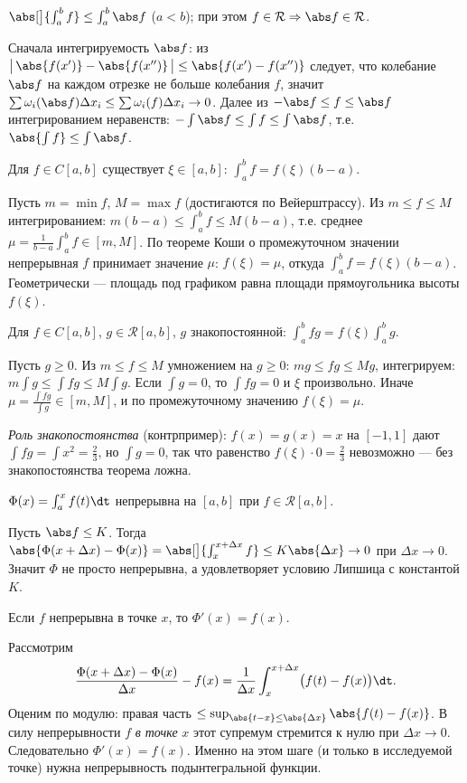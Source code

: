 \stmt $\abs[\big]{\int_a^b f}\le\int_a^b\abs f$ ($a<b$); при этом $f\in\mathcal R\Rightarrow\abs f\in\mathcal R$.

\dok Сначала интегрируемость $\abs f$: из $\bigl|\,\abs{f(x')}-\abs{f(x'')}\,\bigr|\le\abs{f(x')-f(x'')}$
следует, что колебание $\abs f$ на каждом отрезке не больше колебания $f$, значит
$\sum\omega_i(\abs f)\Delta x_i\le\sum\omega_i(f)\Delta x_i\to0$. Далее из $-\abs f\le f\le\abs f$
интегрированием неравенств: $-\int\abs f\le\int f\le\int\abs f$, т.е. $\abs{\int f}\le\int\abs f$.

\stmt Для $f\in C[a,b]$ существует $\xi\in[a,b]$: $\int_a^b f=f(\xi)(b-a)$.

\dok Пусть $m=\min f$, $M=\max f$ (достигаются по Вейерштрассу). Из $m\le f\le M$ интегрированием:
$m(b-a)\le\int_a^b f\le M(b-a)$, т.е. среднее $\mu=\tfrac{1}{b-a}\int_a^b f\in[m,M]$. По теореме
Коши о промежуточном значении непрерывная $f$ принимает значение $\mu$: $f(\xi)=\mu$, откуда
$\int_a^b f=f(\xi)(b-a)$. Геометрически — площадь под графиком равна площади прямоугольника высоты
$f(\xi)$.

\stmt Для $f\in C[a,b]$, $g\in\mathcal R[a,b]$, $g$ знакопостоянной: $\int_a^b fg=f(\xi)\int_a^b g$.

\dok Пусть $g\ge0$. Из $m\le f\le M$ умножением на $g\ge0$: $mg\le fg\le Mg$, интегрируем:
$m\int g\le\int fg\le M\int g$. Если $\int g=0$, то $\int fg=0$ и $\xi$ произвольно. Иначе
$\mu=\tfrac{\int fg}{\int g}\in[m,M]$, и по промежуточному значению $f(\xi)=\mu$.

\emph{Роль знакопостоянства} (контрпример): $f(x)=g(x)=x$ на $[-1,1]$ дают $\int fg=\int x^2=\tfrac23$, но
$\int g=0$, так что равенство $f(\xi)\cdot0=\tfrac23$ невозможно — без знакопостоянства теорема
ложна.

\stmt $\Phi(x)=\int_a^x f(t)\dt$ непрерывна на $[a,b]$ при $f\in\mathcal R[a,b]$.

\dok Пусть $\abs f\le K$. Тогда
$\abs{\Phi(x+\Delta x)-\Phi(x)}=\abs[\big]{\int_x^{x+\Delta x}f}\le K\abs{\Delta x}\to0$ при
$\Delta x\to0$. Значит $\Phi$ не просто непрерывна, а удовлетворяет условию Липшица с константой
$K$.

\stmt Если $f$ непрерывна в точке $x$, то $\Phi'(x)=f(x)$.

\dok Рассмотрим
\[
  \frac{\Phi(x+\Delta x)-\Phi(x)}{\Delta x}-f(x)
  =\frac1{\Delta x}\int_x^{x+\Delta x}\bigl(f(t)-f(x)\bigr)\dt .
\]
Оценим по модулю: правая часть $\le\sup_{\abs{t-x}\le\abs{\Delta x}}\abs{f(t)-f(x)}$. В силу
непрерывности $f$ \emph{в точке} $x$ этот супремум стремится к нулю при $\Delta x\to0$.
Следовательно $\Phi'(x)=f(x)$. Именно на этом шаге (и только в исследуемой точке) нужна
непрерывность подынтегральной функции.

